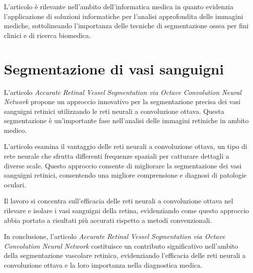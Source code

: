 L'articolo è rilevante nell'ambito dell'informatica medica in quanto evidenzia
l'applicazione di soluzioni informatiche per l'analisi approfondita delle
immagini mediche, sottolineando l'importanza delle tecniche di segmentazione
ossea per fini clinici e di ricerca biomedica.


\section{Segmentazione di vasi sanguigni}
\label{sec:segmentazione_vasi_sanguigni}

L'articolo \textit{Accurate Retinal Vessel Segmentation via Octave Convolution
Neural Network} \cite{fan2020accurate} propone un approccio innovativo per la
segmentazione precisa dei vasi sanguigni retinici utilizzando le reti neurali a
convoluzione ottava. Questa segmentazione è un'importante fase nell'analisi
delle immagini retiniche in ambito medico.

L'articolo esamina il vantaggio delle reti neurali a convoluzione ottava, un
tipo di rete neurale che sfrutta differenti frequenze spaziali per catturare
dettagli a diverse scale. Questo approccio consente di migliorare la
segmentazione dei vasi sanguigni retinici, consentendo una migliore
comprensione e diagnosi di patologie oculari.

Il lavoro si concentra sull'efficacia delle reti neurali a convoluzione ottava
nel rilevare e isolare i vasi sanguigni della retina, evidenziando come questo
approccio abbia portato a risultati più accurati rispetto a metodi
convenzionali.

In conclusione, l'articolo \textit{Accurate Retinal Vessel Segmentation via
Octave Convolution Neural Network} costituisce un contributo significativo
nell'ambito della segmentazione vascolare retinica, evidenziando l'efficacia
delle reti neurali a convoluzione ottava e la loro importanza nella diagnostica
medica.

